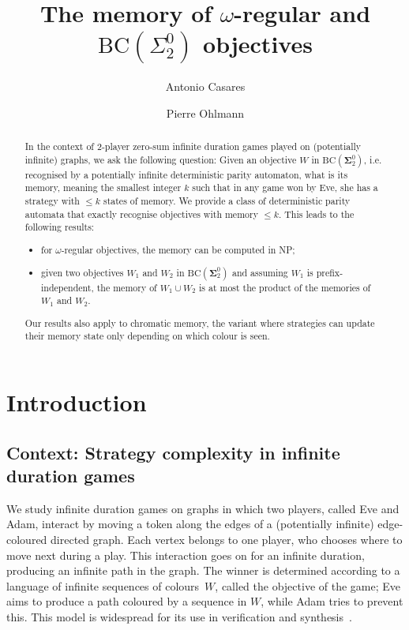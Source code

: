 \documentclass[a4paper,UKenglish,cleveref, thm-restate]{lipics-v2021}
\title{The memory of $\omega$-regular and $\mathrm{BC}(\Sigma_2^0)$ objectives}
\author{Antonio Casares}{University of Warsaw, Poland \and \url{https://antonio-casares.github.io/}}{antoniocasares@mimuw.edu.pl}{https://orcid.org/0000-0002-6539-2020}{Supported by the Polish National Science Centre (NCN) grant ``Polynomial finite state computation'' (2022/46/A/ST6/00072).}
\author{Pierre Ohlmann}{CNRS, Laboratoire d'Informatique et des Systèmes (LIS), Marseille, France\and \url{https://pageperso.lis-lab.fr/pierre.ohlmann/}}{pierre.ohlmann@lis-lab.fr}{https://orcid.org/0000-0002-4685-5253}{}
\begin{document}
\maketitle

\begin{abstract}
In the context of 2-player zero-sum infinite duration games played on (potentially infinite) graphs, we ask the following question: Given an objective $W$ in $\mathrm{BC}(\mathbf{\Sigma}_2^0)$, i.e. recognised by a potentially infinite deterministic parity automaton, what is its memory, meaning the smallest integer $k$ such that in any game won by Eve, she has a strategy with $\leq k$ states of memory.
We provide a class of deterministic parity automata that exactly recognise objectives with memory $\leq k$.
This leads to the following results:
\begin{itemize}
\item for $\omega$-regular objectives, the memory can be computed in NP;
\item given two objectives $W_1$ and $W_2$ in $\mathrm{BC}(\mathbf{\Sigma}_2^0)$ and assuming $W_1$ is prefix-independent, the memory of $W_1 \cup W_2$ is at most the product of the memories of $W_1$ and $W_2$.
\end{itemize}
Our results also apply to chromatic memory, the variant where strategies can update their memory state only depending on which colour is seen.
\end{abstract}


\section{Introduction}
\subsection*{Context: Strategy complexity in infinite duration games}

We study infinite duration games on graphs in which two players, called Eve and Adam, interact by  moving a token along the edges of a (potentially infinite) edge-coloured directed graph. Each vertex belongs to one player, who chooses where to move next during a play. This interaction goes on for an infinite duration, producing an infinite path in the graph. The winner is determined according to a language of infinite sequences of colours~$W$, called the objective of the game; Eve aims to produce a path coloured by a sequence in $W$, while Adam tries to prevent this.
This model is widespread for its use in verification and synthesis~\cite{HandbookModelChecking2018}.
\end{document}
